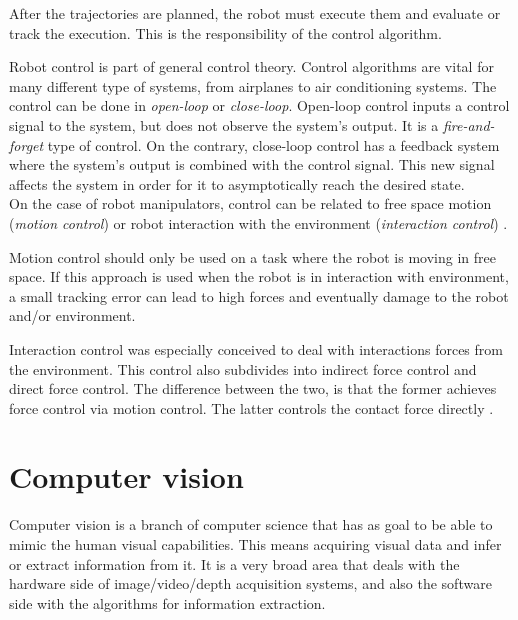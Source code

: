 After the trajectories are planned, the robot must execute them and evaluate or track the execution. This is the responsibility of the control algorithm.

Robot control is part of general control theory. Control algorithms are vital for many different type of systems, from airplanes to air conditioning systems. The control can be done in \emph{open-loop} or \emph{close-loop}. Open-loop control inputs a control signal to the system, but does not observe the system's output. It is a \emph{fire-and-forget} type of control. On the contrary, close-loop control has a feedback system where the system's output is combined with the control signal. This new signal affects the system in order for it to asymptotically reach the desired state.\\  

On the case of robot manipulators, control can be related to free space motion (\emph{motion control}) or robot interaction with the environment (\emph{interaction control}) \cite{Siciliano1999_robot_force_control}. 

Motion control should only be used on a task where the robot is moving in free space. If this approach is used when the robot is in interaction with environment, a small tracking error can lead to high forces and eventually damage to the robot and/or environment. 

Interaction control was especially conceived to deal with interactions forces from the environment. This control also subdivides into {indirect force control} and {direct force control}. The difference between the two, is that the former achieves force control via motion control. The latter controls the contact force directly \cite{Siciliano1999_robot_force_control}.




\section{Computer vision}
\label{sec:computer_vision}

Computer vision is a branch of computer science that has as goal to be able to mimic the human visual capabilities. This means acquiring visual data and infer or extract information from it. It is a very broad area that deals with the hardware side of image/video/depth acquisition systems, and also the software side with the algorithms for information extraction.

